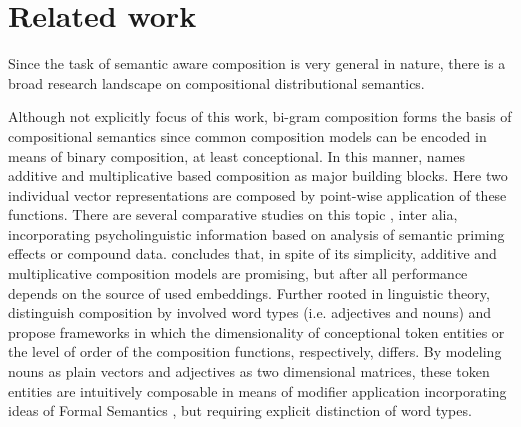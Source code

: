 \section{Related work}
Since the task of semantic aware composition is very general in nature, there is a broad research landscape on compositional distributional semantics. 


Although not explicitly focus of this work, bi-gram composition forms the basis of compositional semantics since common composition models can be encoded in means of binary composition, at least conceptional. In this manner, \textcite{zanzotto_estimating_2010} names additive and multiplicative based composition as major building blocks. Here two individual vector representations are composed by point-wise application of these functions. There are several comparative studies on this topic \autocite{mitchell_composition_2010, dima_reverse-engineering_2015}, inter alia, incorporating psycholinguistic information based on analysis of semantic priming effects or compound data. \textcite{mitchell_composition_2010} concludes that, in spite of its simplicity, additive and multiplicative composition models are promising, but after all performance depends on the source of used embeddings. %
Further rooted in linguistic theory, \textcite{baroni_nouns_2010, baroni_frege_2014} distinguish composition by involved word types (i.e. adjectives and nouns) and propose frameworks in which the dimensionality of conceptional token entities or the level of order of the composition functions, respectively, differs. By modeling nouns as plain vectors and adjectives as two dimensional matrices, these token entities are intuitively composable in means of modifier application incorporating ideas of Formal Semantics \autocite{montague_proper_1973}, but requiring explicit distinction of word types.

